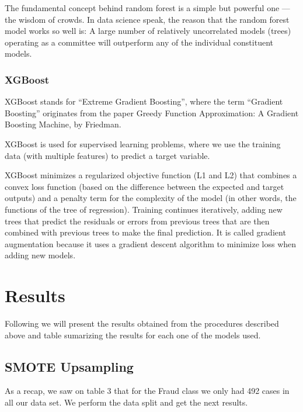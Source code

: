 \documentclass[
]{article}
\begin{document}
The fundamental concept behind random forest is a simple but powerful
one --- the wisdom of crowds. In data science speak, the reason that the
random forest model works so well is: A large number of relatively
uncorrelated models (trees) operating as a committee will outperform any
of the individual constituent models.

\hypertarget{xgboost}{%
\subsubsection{XGBoost}\label{xgboost}}

XGBoost stands for ``Extreme Gradient Boosting'', where the term
``Gradient Boosting'' originates from the paper Greedy Function
Approximation: A Gradient Boosting Machine, by Friedman.

XGBoost is used for supervised learning problems, where we use the
training data (with multiple features) to predict a target variable.

XGBoost minimizes a regularized objective function (L1 and L2) that
combines a convex loss function (based on the difference between the
expected and target outputs) and a penalty term for the complexity of
the model (in other words, the functions of the tree of regression).
Training continues iteratively, adding new trees that predict the
residuals or errors from previous trees that are then combined with
previous trees to make the final prediction. It is called gradient
augmentation because it uses a gradient descent algorithm to minimize
loss when adding new models.

\newpage

\newpage

\hypertarget{results}{%
\section{Results}\label{results}}

Following we will present the results obtained from the procedures
described above and table sumarizing the results for each one of the
models used.

\hypertarget{smote-upsampling}{%
\subsection{SMOTE Upsampling}\label{smote-upsampling}}

As a recap, we saw on table 3 that for the Fraud class we only had 492
cases in all our data set. We perform the data split and get the next
results.
\end{document}
